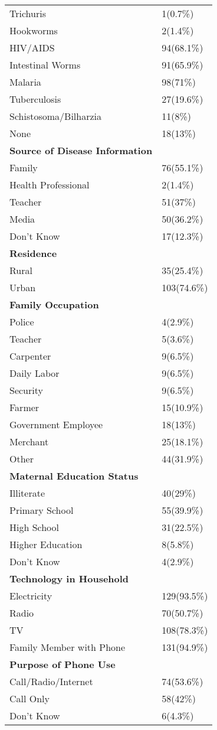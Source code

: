 \documentclass[10pt,letterpaper]{article}
\begin{document}
\begin{longtable}{ll}
Trichuris & 1(0.7\%) \\
Hookworms & 2(1.4\%) \\
HIV/AIDS & 94(68.1\%) \\
Intestinal Worms & 91(65.9\%) \\
Malaria & 98(71\%) \\
Tuberculosis & 27(19.6\%) \\
Schistosoma/Bilharzia & 11(8\%) \\
None & 18(13\%) \\
\midrule
\textbf{Source of Disease Information} & \\
Family & 76(55.1\%) \\
Health Professional & 2(1.4\%) \\
Teacher & 51(37\%) \\
Media & 50(36.2\%) \\
Don't Know & 17(12.3\%) \\
\midrule
\textbf{Residence} & \\
Rural & 35(25.4\%) \\
Urban & 103(74.6\%) \\
\midrule
\textbf{Family Occupation} & \\
Police & 4(2.9\%) \\
Teacher & 5(3.6\%) \\
Carpenter & 9(6.5\%) \\
Daily Labor & 9(6.5\%) \\
Security & 9(6.5\%) \\
Farmer & 15(10.9\%) \\
Government Employee & 18(13\%) \\
Merchant & 25(18.1\%) \\
Other & 44(31.9\%) \\
\midrule
\textbf{Maternal Education Status} & \\
Illiterate & 40(29\%) \\
Primary School & 55(39.9\%) \\
High School & 31(22.5\%) \\
Higher Education & 8(5.8\%) \\
Don't Know & 4(2.9\%) \\
\midrule
\textbf{Technology in Household} & \\
Electricity & 129(93.5\%) \\
Radio & 70(50.7\%) \\
TV & 108(78.3\%) \\
Family Member with Phone & 131(94.9\%) \\
\midrule
\textbf{Purpose of Phone Use} & \\
Call/Radio/Internet & 74(53.6\%) \\
Call Only & 58(42\%) \\
Don't Know & 6(4.3\%) \\
\midrule
\bottomrule
\end{longtable}
\end{document}
